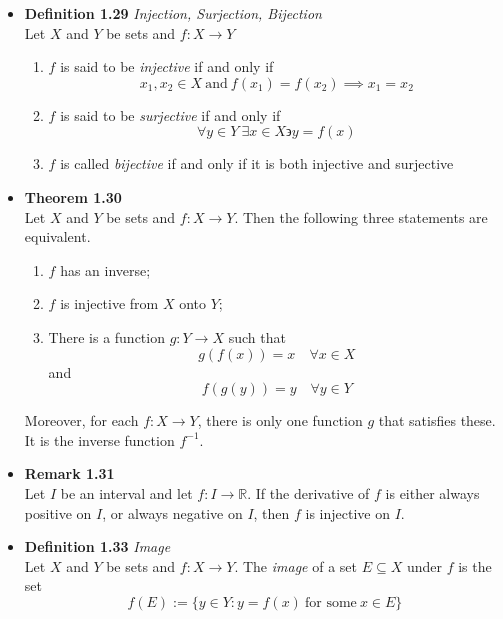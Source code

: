 \documentclass[11pt,a4paper]{article}
\begin{document}
\begin{itemize}
    \item \textbf{Definition 1.29} \emph{Injection, Surjection, Bijection} \\
        Let $X$ and $Y$ be sets and $f : X \to Y$
        \begin{enumerate}
            \item $f$ is said to be \emph{injective} if and only if
                \[
                    x_1, x_2 \in X \ \text{and} \ f(x_1) = f(x_2) \implies x_1 = x_2
                \]
            \item $f$ is said to be \emph{surjective} if and only if
                \[
                    \forall y \in Y \ \exists x \in X \backepsilon y = f(x)
                \]

            \item $f$ is called \emph{bijective} if and only if it is both injective
                and surjective
        \end{enumerate}
    \item \textbf{Theorem 1.30} \\
        Let $X$ and $Y$ be sets and $f : X \to Y$.
        Then the following three statements are equivalent.
        \begin{enumerate}
            \item $f$ has an inverse;
            \item $f$ is injective from $X$ onto $Y$;
            \item There is a function $g : Y \to X$ such that
                \[
                    g(f(x)) = x \quad \forall x \in X
                \]
                and
                \[
                    f(g(y)) = y \quad \forall y \in Y
                \]
        \end{enumerate}
        Moreover, for each $f : X \to Y$, there is only one function $g$ that satisfies these.
        It is the inverse function $f^{-1}$.
    \item \textbf{Remark 1.31} \\
        Let $I$ be an interval and let $f : I \to \mathbb{R}$.
        If the derivative of $f$ is either always positive on $I$, or always negative on $I$,
        then $f$ is injective on $I$.
    \item \textbf{Definition 1.33} \emph{Image} \\
        Let $X$ and $Y$ be sets and $f : X \to Y$.
        The \emph{image} of a set $E \subseteq X$ under $f$ is the set
        \[
            f(E) := \{ y \in Y : y = f(x) \ \text{for some} \ x \in E \}
\]
\end{itemize}
\end{document}

